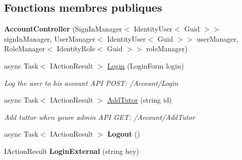 \subsection*{Fonctions membres publiques}
\begin{DoxyCompactItemize}
\item 
\mbox{\label{class_mediwatch_1_1_server_1_1_controllers_1_1_account_controller_a68b985c608e83237a0b41202149d7cf7}} 
{\bfseries Account\+Controller} (Sign\+In\+Manager$<$ Identity\+User$<$ Guid $>$$>$ sign\+In\+Manager, User\+Manager$<$ Identity\+User$<$ Guid $>$$>$ user\+Manager, Role\+Manager$<$ Identity\+Role$<$ Guid $>$$>$ role\+Manager)
\item 
async Task$<$ I\+Action\+Result $>$ \hyperlink{class_mediwatch_1_1_server_1_1_controllers_1_1_account_controller_a0eca1869d875e9cdfbc6e9bc4540ae41}{Login} (Login\+Form login)
\begin{DoxyCompactList}\small\item\em Log the user to his account A\+PI P\+O\+ST\+: /\+Account/\+Login \end{DoxyCompactList}\item 
async Task$<$ I\+Action\+Result $>$ \hyperlink{class_mediwatch_1_1_server_1_1_controllers_1_1_account_controller_a6aadf8689cfa5cdc1485f7fb0fabc073}{Add\+Tutor} (string id)
\begin{DoxyCompactList}\small\item\em Add tuttor when you\textquotesingle{}re admin A\+PI G\+ET\+: /\+Account/\+Add\+Tutor \end{DoxyCompactList}\item 
\mbox{\label{class_mediwatch_1_1_server_1_1_controllers_1_1_account_controller_a177b908ddf5a0c4ec5e3269e4cbcb252}} 
async Task$<$ I\+Action\+Result $>$ {\bfseries Logout} ()
\item 
\mbox{\label{class_mediwatch_1_1_server_1_1_controllers_1_1_account_controller_a7f1a46f59d4b8fff4e948992fcf9f605}} 
I\+Action\+Result {\bfseries Login\+External} (string hey)
\item 
\mbox{\label{class_mediwatch_1_1_server_1_1_controllers_1_1_account_controller_ab3cb65a34f1dd5de150ebf5b956ff414}} 
$$
\end{DoxyCompactItemize}
